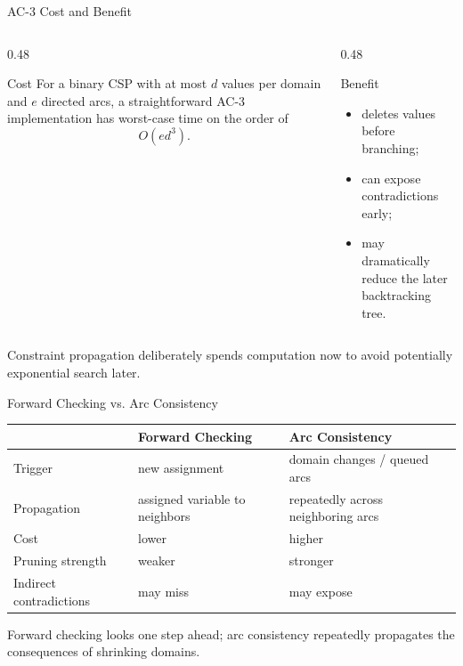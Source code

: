 \documentclass[aspectratio=169,10pt]{beamer}
\begin{document}
\begin{frame}[shrink=20]{AC-3 Cost and Benefit}
  \begin{columns}[T,onlytextwidth]
    \begin{column}{0.48\textwidth}
      \begin{block}{Cost}
        For a binary CSP with at most $d$ values per domain and $e$ directed arcs, a straightforward AC-3 implementation has worst-case time on the order of
        \[
          O(ed^3).
        \]
      \end{block}
    \end{column}

    \begin{column}{0.48\textwidth}
      \begin{block}{Benefit}
        \begin{itemize}
          \item deletes values before branching;
          \item can expose contradictions early;
          \item may dramatically reduce the later backtracking tree.
        \end{itemize}
      \end{block}
    \end{column}
  \end{columns}

  \begin{keyidea}
    Constraint propagation deliberately spends computation now to avoid potentially exponential search later.
  \end{keyidea}
\end{frame}

\begin{frame}[shrink=20]{Forward Checking vs. Arc Consistency}
  \begin{center}
  \renewcommand{\arraystretch}{1.35}
  \begin{tabular}{l|l|l}
    & \textbf{Forward Checking} & \textbf{Arc Consistency} \\\hline
    Trigger & new assignment & domain changes / queued arcs \\
    Propagation & assigned variable to neighbors & repeatedly across neighboring arcs \\
    Cost & lower & higher \\
    Pruning strength & weaker & stronger \\
    Indirect contradictions & may miss & may expose
  \end{tabular}
  \end{center}

  \begin{keyidea}
    Forward checking looks one step ahead; arc consistency repeatedly propagates the consequences of shrinking domains.
  \end{keyidea}
\end{frame}
\end{document}
